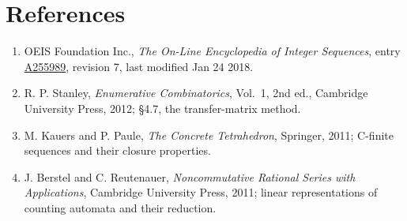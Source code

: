 \documentclass[11pt]{article}
\theoremstyle{definition}
\begin{document}
\section{References}

\begin{enumerate}

\item OEIS Foundation Inc., \emph{The On-Line Encyclopedia of Integer Sequences}, entry \href{https://oeis.org/A255989}{A255989}, revision 7, last modified Jan 24 2018.

\item R. P. Stanley, \emph{Enumerative Combinatorics}, Vol.~1, 2nd ed., Cambridge University Press, 2012; \S4.7, the transfer-matrix method.

\item M. Kauers and P. Paule, \emph{The Concrete Tetrahedron}, Springer, 2011; C-finite sequences and their closure properties.

\item J. Berstel and C. Reutenauer, \emph{Noncommutative Rational Series with Applications}, Cambridge University Press, 2011; linear representations of counting automata and their reduction.

\end{enumerate}
\end{document}
